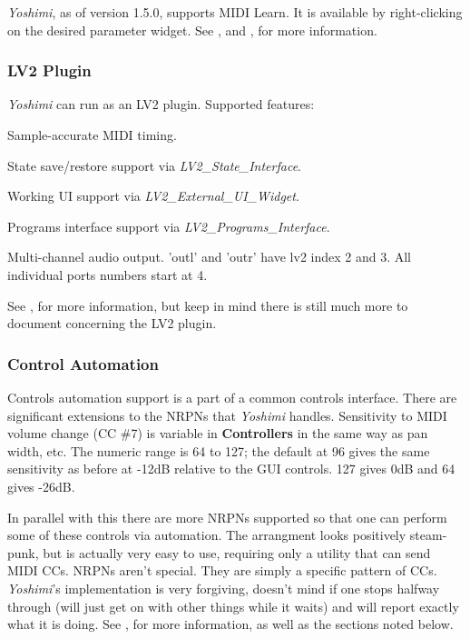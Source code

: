 \documentclass[
 11pt,
 twoside,
 a4paper,
 final                                 %
]{article}
\begin{document}
   \textsl{Yoshimi}, as of version 1.5.0, supports MIDI Learn.
   It is available by right-clicking on the desired parameter widget.
   See ,
   and , for more information.

\subsubsection{LV2 Plugin}
\label{subsubsec:new_features_lv2_plugin}

   \textsl{Yoshimi} can run as an LV2 plugin.  Supported features:

   \begin{enumber}
      \item Sample-accurate MIDI timing.
      \item State save/restore support via \textsl{LV2\_State\_Interface}.
      \item Working UI support via \textsl{LV2\_External\_UI\_Widget}.
      \item Programs interface support via \textsl{LV2\_Programs\_Interface}.
      \item Multi-channel audio output.
         'outl' and 'outr' have lv2 index 2 and 3.
         All individual ports numbers start at 4.
   \end{enumber}

   See , for more information, but keep in
   mind there is still much more to document concerning the LV2 plugin.

\subsubsection{Control Automation}
\label{subsubsec:new_features_control_automation}

   Controls automation support is a part of a common
   controls interface.  There are significant extensions to the NRPNs that
   \textsl{Yoshimi} handles.
   Sensitivity to MIDI volume change (CC \#7) is variable in
   \textbf{Controllers} in the same way as pan width, etc. The numeric range is
   64 to 127; the default at 96 gives the same sensitivity as before at -12dB
   relative to the GUI controls.  127 gives 0dB and 64 gives -26dB.

   In parallel with this there are more NRPNs supported so that one can perform
   some of these controls via automation. The arrangment looks positively
   steam-punk, but is actually very easy to use, requiring only a utility that
   can send MIDI CCs.  NRPNs aren't special. They are simply a specific pattern
   of CCs.  \textsl{Yoshimi}'s implementation is very forgiving, doesn't mind
   if one stops halfway through (will just get on with other things while it
   waits) and will report exactly what it is doing.
   See , for more information, as well as the sections
   noted below.
\end{document}
